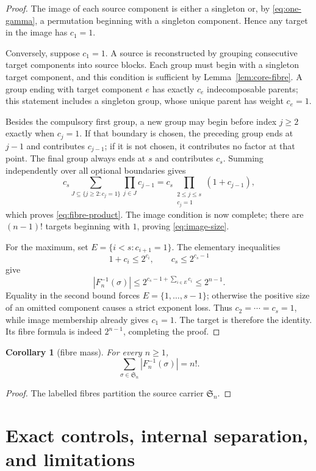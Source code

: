 \documentclass[a4paper,10pt]{amsart}
\newtheorem{corollary}[theorem]{Corollary}
\theoremstyle{definition}
\theoremstyle{remark}
\newcommand{\Sn}{\mathfrak S_n}
\begin{document}
\begin{proof}
The image of each source component is either a singleton or, by
\eqref{eq:one-gamma}, a permutation beginning with a singleton component.
Hence any target in the image has $c_1=1$.

Conversely, suppose $c_1=1$.  A source is reconstructed by grouping
consecutive target components into source blocks.  Each group must begin
with a singleton target component, and this condition is sufficient by
Lemma~\ref{lem:core-fibre}.  A group ending with target component $e$ has
exactly $c_e$ indecomposable parents; this statement includes a singleton
group, whose unique parent has weight $c_e=1$.

Besides the compulsory first group, a new group may begin before index
$j\ge2$ exactly when $c_j=1$.  If that boundary is chosen, the preceding
group ends at $j-1$ and contributes $c_{j-1}$; if it is not chosen, it
contributes no factor at that point.  The final group always ends at $s$ and
contributes $c_s$.  Summing independently over all optional boundaries gives
\[
 c_s\sum_{J\subseteq\{j\ge2:c_j=1\}}\prod_{j\in J}c_{j-1}
 =c_s\prod_{\substack{2\le j\le s\\c_j=1}}(1+c_{j-1}),
\]
which proves \eqref{eq:fibre-product}.  The image condition is now complete;
there are $(n-1)!$ targets beginning with $1$, proving
\eqref{eq:image-size}.

For the maximum, set
$E=\{i<s:c_{i+1}=1\}$.  The elementary inequalities
\[
 1+c_i\le2^{c_i},\qquad c_s\le2^{c_s-1}
\]
give
\[
 |F_n^{-1}(\sigma)|
 \le2^{c_s-1+\sum_{i\in E}c_i}
 \le2^{n-1}.
\]
Equality in the second bound forces $E=\{1,\ldots,s-1\}$; otherwise the
positive size of an omitted component causes a strict exponent loss.  Thus
$c_2=\cdots=c_s=1$, while image membership already gives $c_1=1$.
The target is therefore the identity.  Its fibre formula is indeed
$2^{n-1}$, completing the proof.
\end{proof}

\begin{corollary}[fibre mass]\label{cor:mass}
For every $n\ge1$,
\[
                    \sum_{\sigma\in\Sn}|F_n^{-1}(\sigma)|=n!.
\]
\end{corollary}

\begin{proof}
The labelled fibres partition the source carrier $\Sn$.
\end{proof}

\section{Exact controls, internal separation, and limitations}
\end{document}
